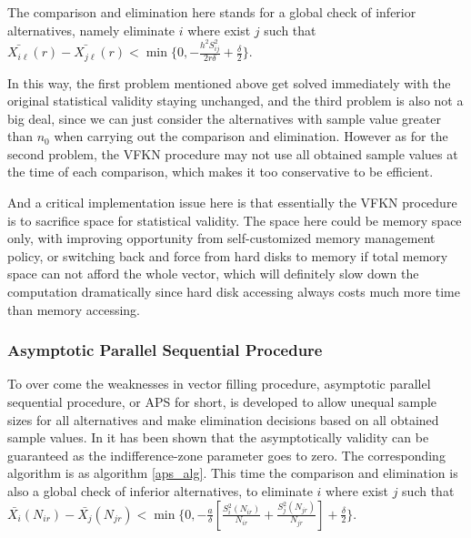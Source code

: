 The comparison and elimination here stands for a global check of inferior alternatives, namely eliminate $i$ where exist $j$ such that $\bar{X_{i\ell}}(r) - \bar{X_{j\ell}}(r) < \min\{0, -\frac{h^2S_{ij}^2}{2r\delta} + \frac{\delta}{2}\}$.

In this way, the first problem mentioned above get solved immediately with the original statistical validity staying unchanged, and the third problem is also not a big deal, since we can just consider the alternatives with sample value greater than $n_0$ when carrying out the comparison and elimination. However as for the second problem, the VFKN procedure may not use all obtained sample values at the time of each comparison, which makes it too conservative to be efficient.

And a critical implementation issue here is that essentially the VFKN procedure is to sacrifice space for statistical validity. The space here could be memory space only, with improving opportunity from self-customized memory management policy, or switching back and force from hard disks to memory if total memory space can not afford the whole vector, which will definitely slow down the computation dramatically since hard disk accessing always costs much more time than memory accessing.

\subsubsection{Asymptotic Parallel Sequential Procedure}

To over come the weaknesses in vector filling procedure, asymptotic parallel sequential procedure, or APS for short, is developed to allow unequal sample sizes for all alternatives and make elimination decisions based on all obtained sample values. In \cite{ras-seq-parallel} it has been shown that the asymptotically validity can be guaranteed as the indifference-zone parameter goes to zero. The corresponding algorithm is as algorithm \ref{aps_alg}. This time the comparison and elimination is also a global check of inferior alternatives, to eliminate $i$ where exist $j$ such that $\bar{X_{i}}(N_{ir}) - \bar{X_{j}}(N_{jr}) < \min\{0, -\frac{a}{\delta}[\frac{S_i^2(N_{ir})}{N_{ir}} + \frac{S_j^2(N_{jr})}{N_{jr}}] + \frac{\delta}{2}\}$.

